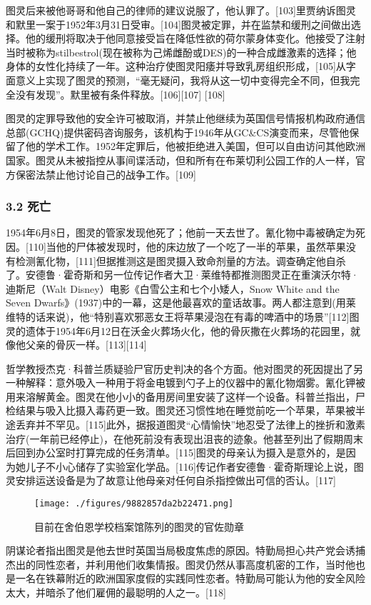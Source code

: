 图灵后来被他哥哥和他自己的律师的建议说服了，他认罪了。[103]里贾纳诉图灵和默里一案于1952年3月31日受审。[104]图灵被定罪，并在监禁和缓刑之间做出选择。他的缓刑将取决于他同意接受旨在降低性欲的荷尔蒙身体变化。他接受了注射当时被称为stilbestrol(现在被称为己烯雌酚或DES)的一种合成雌激素的选择；他身体的女性化持续了一年。这种治疗使图灵阳痿并导致乳房组织形成，[105]从字面意义上实现了图灵的预测，“毫无疑问，我将从这一切中变得完全不同，但我完全没有发现”。默里被有条件释放。[106][107] [108]

图灵的定罪导致他的安全许可被取消，并禁止他继续为英国信号情报机构政府通信总部(GCHQ)提供密码咨询服务，该机构于1946年从GC&CS演变而来，尽管他保留了他的学术工作。1952年定罪后，他被拒绝进入美国，但可以自由访问其他欧洲国家。图灵从未被指控从事间谍活动，但和所有在布莱切利公园工作的人一样，官方保密法禁止他讨论自己的战争工作。[109]
\subsubsection{3.2 死亡}
1954年6月8日，图灵的管家发现他死了；他前一天去世了。氰化物中毒被确定为死因。[110]当他的尸体被发现时，他的床边放了一个吃了一半的苹果，虽然苹果没有检测氰化物，[111]但据推测这是图灵摄入致命剂量的方法。调查确定他自杀了。安德鲁·霍奇斯和另一位传记作者大卫·莱维特都推测图灵正在重演沃尔特·迪斯尼（Walt Disney）电影《白雪公主和七个小矮人，Snow White and the Seven Dwarfs》(1937)中的一幕，这是他最喜欢的童话故事。两人都注意到(用莱维特的话来说)，他“特别喜欢邪恶女王将苹果浸泡在有毒的啤酒中的场景”[112]图灵的遗体于1954年6月12日在沃金火葬场火化，他的骨灰撒在火葬场的花园里，就像他父亲的骨灰一样。[113][114]

哲学教授杰克·科普兰质疑验尸官历史判决的各个方面。他对图灵的死因提出了另一种解释：意外吸入一种用于将金电镀到勺子上的仪器中的氰化物烟雾。氰化钾被用来溶解黄金。图灵在他小小的备用房间里安装了这样一个设备。科普兰指出，尸检结果与吸入比摄入毒药更一致。图灵还习惯性地在睡觉前吃一个苹果，苹果被半途丢弃并不罕见。[115]此外，据报道图灵“心情愉快”地忍受了法律上的挫折和激素治疗(一年前已经停止)，在他死前没有表现出沮丧的迹象。他甚至列出了假期周末后回到办公室时打算完成的任务清单。[115]图灵的母亲认为摄入是意外的，是因为她儿子不小心储存了实验室化学品。[116]传记作者安德鲁·霍奇斯理论上说，图灵安排运送设备是为了故意让他母亲对任何自杀指控做出可信的否认。[117]
\begin{figure}[ht]
\centering
\texttt{[image: ./figures/9882857da2b22471.png]}
\caption{目前在舍伯恩学校档案馆陈列的图灵的官佐勋章} \label{fig_ALTL_6}
\end{figure}
阴谋论者指出图灵是他去世时英国当局极度焦虑的原因。特勤局担心共产党会诱捕杰出的同性恋者，并利用他们收集情报。图灵仍然从事高度机密的工作，当时他也是一名在铁幕附近的欧洲国家度假的实践同性恋者。特勤局可能认为他的安全风险太大，并暗杀了他们雇佣的最聪明的人之一。[118]

